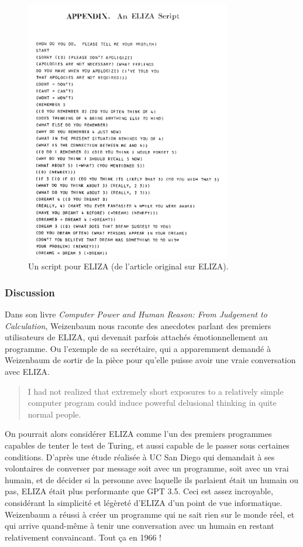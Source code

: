 \documentclass[11pt, a4paper]{report}
\begin{document}
  \begin{figure}[h]
    \centering
    \includegraphics[width=0.8\textwidth]{eliza-script-example.png}
    \caption{Un script pour ELIZA (de l'article original sur ELIZA).}
    \label{fig:eliza-script}
  \end{figure}

      \subsubsection{Discussion}
Dans son livre \textit{Computer Power and Human Reason: From Judgement to Calculation}, 
Weizenbaum nous raconte des anecdotes parlant des premiers utilisateurs de ELIZA, 
qui devenait parfois attachés émotionnellement au programme. Ou l'exemple de sa 
secrétaire, qui a apparemment demandé à Weizenbaum de sortir de la pièce pour qu'elle 
puisse avoir une vraie conversation avec ELIZA.  

\begin{quote}
  I had not realized that extremely short exposures to a relatively simple computer program could 
  induce powerful delusional thinking in quite normal people.
  \cite{weizenbaum-book}
\end{quote}

On pourrait alors considérer ELIZA comme l'un des premiers programmes capables de tenter 
le test de Turing, et aussi capable de le passer sous certaines conditions. 
D'après une étude réalisée à UC San Diego \cite{eliza-gpt} qui demandait à ses volontaires de converser 
par message soit avec un programme, soit avec un vrai humain, et de décider si la personne 
avec laquelle ils parlaient était un humain ou pas, ELIZA était plus performante que GPT 3.5. 
Ceci est assez incroyable, considérant la simplicité et légèreté d'ELIZA d'un point de vue 
informatique. Weizenbaum a réussi à créer un programme qui ne sait rien sur le monde réel, 
et qui arrive quand-même à tenir une conversation avec un humain en restant relativement 
convaincant. Tout ça en 1966 ! 
\end{document}
